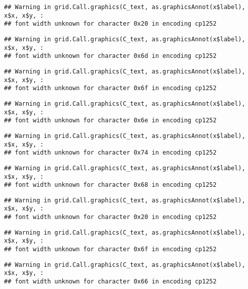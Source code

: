 \documentclass[
]{article}
\begin{document}
\begin{verbatim}
## Warning in grid.Call.graphics(C_text, as.graphicsAnnot(x$label), x$x, x$y, :
## font width unknown for character 0x20 in encoding cp1252
\end{verbatim}

\begin{verbatim}
## Warning in grid.Call.graphics(C_text, as.graphicsAnnot(x$label), x$x, x$y, :
## font width unknown for character 0x6d in encoding cp1252
\end{verbatim}

\begin{verbatim}
## Warning in grid.Call.graphics(C_text, as.graphicsAnnot(x$label), x$x, x$y, :
## font width unknown for character 0x6f in encoding cp1252
\end{verbatim}

\begin{verbatim}
## Warning in grid.Call.graphics(C_text, as.graphicsAnnot(x$label), x$x, x$y, :
## font width unknown for character 0x6e in encoding cp1252
\end{verbatim}

\begin{verbatim}
## Warning in grid.Call.graphics(C_text, as.graphicsAnnot(x$label), x$x, x$y, :
## font width unknown for character 0x74 in encoding cp1252
\end{verbatim}

\begin{verbatim}
## Warning in grid.Call.graphics(C_text, as.graphicsAnnot(x$label), x$x, x$y, :
## font width unknown for character 0x68 in encoding cp1252
\end{verbatim}

\begin{verbatim}
## Warning in grid.Call.graphics(C_text, as.graphicsAnnot(x$label), x$x, x$y, :
## font width unknown for character 0x20 in encoding cp1252
\end{verbatim}

\begin{verbatim}
## Warning in grid.Call.graphics(C_text, as.graphicsAnnot(x$label), x$x, x$y, :
## font width unknown for character 0x6f in encoding cp1252
\end{verbatim}

\begin{verbatim}
## Warning in grid.Call.graphics(C_text, as.graphicsAnnot(x$label), x$x, x$y, :
## font width unknown for character 0x66 in encoding cp1252
\end{verbatim}
\end{document}
